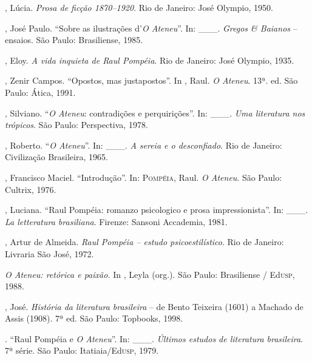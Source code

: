 \begin{bibliohedra}
, Lúcia. \textit{Prosa de ficção 1870--1920}. Rio de
Janeiro: José Olympio, 1950. 

, José Paulo. ``Sobre as ilustrações d'\textit{O
Ateneu}''. In: \_\_\_. \textit{Gregos \& Baianos} -- ensaios. São Paulo:
Brasiliense, 1985.

, Eloy. \textit{A vida inquieta de Raul Pompéia}.
Rio de Janeiro: José Olympio, 1935.

, Zenir Campos. ``Opostos, mas justapostos''. In
, Raul. \textit{O Ateneu}. 13ª. ed. São Paulo:
Ática, 1991.

, Silviano. ``\textit{O Ateneu}: contradições e perquirições''.
In: \_\_\_. \textit{Uma literatura nos trópicos}. São Paulo:
Perspectiva, 1978.

, Roberto. ``\textit{O Ateneu}''. In: \_\_\_. \textit{A sereia e o
desconfiado}. Rio de Janeiro: Civilização Brasileira, 1965. 

, Francisco Maciel. ``Introdução''. In:
\textsc{Pompéia}, Raul. \textit{O Ateneu}. São Paulo: Cultrix, 1976.

, Luciana. ``Raul Pompéia: romanzo
psicologico e prosa impressionista''. In: \_\_\_. \textit{La letteratura
brasiliana}. Firenze: Sansoni Accademia, 1981.

, Artur de Almeida. \textit{Raul Pompéia -- estudo
psicoestilístico}. Rio de Janeiro: Livraria São José, 1972.

\textit{O Ateneu: retórica e paixão.}
In , Leyla (org.). São Paulo: Brasiliense
/ Ed\textsc{usp}, 1988.

, José. \textit{História da literatura
brasileira } -- de Bento Teixeira (1601) a Machado de
Assis (1908). 7ª 
ed. São Paulo: Topbooks, 1998. 

\titidem. ``Raul Pompéia e \textit{O Ateneu}''. In: \_\_\_.
\textit{Últimos estudos de literatura brasileira}. 7ª
série. São Paulo: Itatiaia/Ed\textsc{usp}, 1979.
\end{bibliohedra}